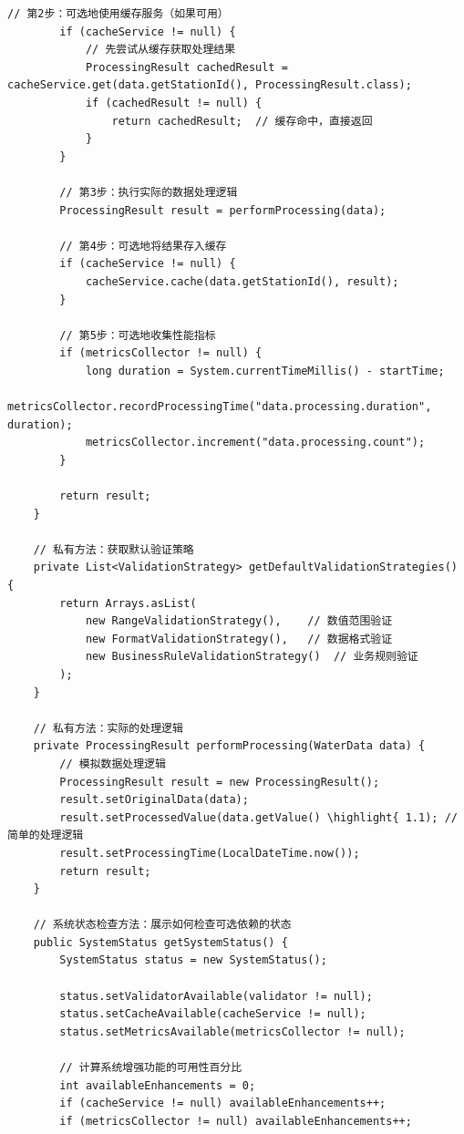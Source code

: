 \begin{lstlisting}[style=java]
        // 第2步：可选地使用缓存服务（如果可用）
        if (cacheService != null) {
            // 先尝试从缓存获取处理结果
            ProcessingResult cachedResult = cacheService.get(data.getStationId(), ProcessingResult.class);
            if (cachedResult != null) {
                return cachedResult;  // 缓存命中，直接返回
            }
        }
        
        // 第3步：执行实际的数据处理逻辑
        ProcessingResult result = performProcessing(data);
        
        // 第4步：可选地将结果存入缓存
        if (cacheService != null) {
            cacheService.cache(data.getStationId(), result);
        }
        
        // 第5步：可选地收集性能指标
        if (metricsCollector != null) {
            long duration = System.currentTimeMillis() - startTime;
            metricsCollector.recordProcessingTime("data.processing.duration", duration);
            metricsCollector.increment("data.processing.count");
        }
        
        return result;
    }
    
    // 私有方法：获取默认验证策略
    private List<ValidationStrategy> getDefaultValidationStrategies() {
        return Arrays.asList(
            new RangeValidationStrategy(),    // 数值范围验证
            new FormatValidationStrategy(),   // 数据格式验证
            new BusinessRuleValidationStrategy()  // 业务规则验证
        );
    }
    
    // 私有方法：实际的处理逻辑
    private ProcessingResult performProcessing(WaterData data) {
        // 模拟数据处理逻辑
        ProcessingResult result = new ProcessingResult();
        result.setOriginalData(data);
        result.setProcessedValue(data.getValue() \highlight{ 1.1); // 简单的处理逻辑
        result.setProcessingTime(LocalDateTime.now());
        return result;
    }
    
    // 系统状态检查方法：展示如何检查可选依赖的状态
    public SystemStatus getSystemStatus() {
        SystemStatus status = new SystemStatus();
        
        status.setValidatorAvailable(validator != null);
        status.setCacheAvailable(cacheService != null);
        status.setMetricsAvailable(metricsCollector != null);
        
        // 计算系统增强功能的可用性百分比
        int availableEnhancements = 0;
        if (cacheService != null) availableEnhancements++;
        if (metricsCollector != null) availableEnhancements++;
        

\end{lstlisting}
